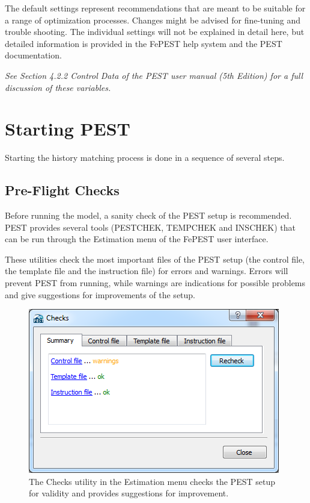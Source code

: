 The default settings represent recommendations that are meant to be suitable for a range of optimization processes. Changes might be advised for fine-tuning and trouble shooting. The individual settings will not be explained in detail here, but detailed information is provided in the FePEST help system and the PEST documentation.

\textit{See Section 4.2.2 Control Data of the PEST user manual (5th Edition) for a full discussion of these variables.}

\section{Starting PEST}

Starting the history matching process is done in a sequence of several steps.

\subsection{Pre-Flight Checks}

Before running the model, a sanity check of the PEST setup is recommended. PEST provides several tools (PESTCHEK, TEMPCHEK and INSCHEK) that can be run through the Estimation menu of the FePEST user interface. 

These utilities check the most important files of the PEST setup (the control file, the template file and the instruction file) for errors and warnings. Errors will prevent PEST from running, while warnings are indications for possible problems and give suggestions for improvements of the setup.

\begin{figure}
	\center
	\includegraphics[width=\columnwidth]{figureFundamentalSetup/ChecksDialog.png}
\caption{The Checks utility in the Estimation menu checks the PEST setup for validity and provides suggestions for improvement.}
\label{fig:fepest:ChecksDialog}
\end{figure}

